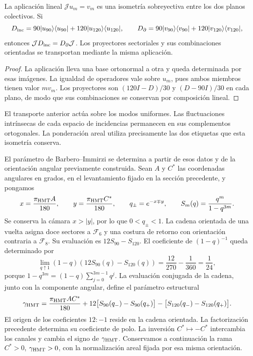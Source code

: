 \begin{proposition}
\label{rev4:ae:colectivo}
La aplicación lineal \(\mathcal J u_m=v_m\) es una isometría
sobreyectiva entre los dos planos colectivos. Si
\[
 D_{\rm inc}=90|u_{90}\rangle\langle u_{90}|
             +120|u_{120}\rangle\langle u_{120}|,
 \qquad
 D_\partial=90|v_{90}\rangle\langle v_{90}|
             +120|v_{120}\rangle\langle v_{120}|,
\]
entonces \(\mathcal J D_{\rm inc}=D_\partial\mathcal J\).
Los proyectores sectoriales y sus combinaciones orientadas se
transportan mediante la misma aplicación.
\end{proposition}
\begin{proof}
La aplicación lleva una base ortonormal a otra y queda determinada
por esas imágenes. La igualdad de operadores vale sobre \(u_m\),
pues ambos miembros tienen valor \(m v_m\). Los proyectores son
\((120I-D)/30\) y \((D-90I)/30\) en cada plano, de modo que
sus combinaciones se conservan por composición lineal.
\end{proof}

El transporte anterior actúa sobre los modos uniformes. Las fluctuaciones
intrínsecas de cada espacio de incidencias permanecen en sus complementos
ortogonales. La ponderación areal utiliza precisamente las dos etiquetas
que esta isometría conserva.

El parámetro de Barbero--Immirzi se determina a partir de esos datos y
de la orientación angular previamente construida. Sean \(A\) y \(C^*\)
las coordenadas angulares en grados, en el levantamiento fijado en la
sección precedente, y pongamos
\[
 x=\frac{\pi_{\rm HMT}A}{180},\qquad
 y=\frac{\pi_{\rm HMT}C^*}{180},\qquad
 q_\pm=e^{-x\mp y},\qquad
 S_m(q)=\frac{q^m}{1-q^{3m}}.
\]
Se conserva la cámara \(x>|y|\), por lo que \(0<q_\pm<1\).
La cadena orientada de una vuelta asigna doce sectores a
\(\mathcal F_6\) y una costura de retorno con orientación contraria
a \(\mathcal F_8\). Su evaluación es \(12S_{90}-S_{120}\).
El coeficiente de \((1-q)^{-1}\) queda determinado por
\[
 \lim_{q\uparrow1}(1-q)(12S_{90}(q)-S_{120}(q))
 =\frac{12}{270}-\frac1{360}=\frac1{24},
\]
porque \(1-q^{3m}=(1-q)\sum_{j=0}^{3m-1}q^j\).
La evaluación conjugada de la cadena, junto con la componente angular,
define el parámetro estructural
\begin{equation}
 \gamma_{\rm HMT}
 =\frac{\pi_{\rm HMT}AC^*}{180}
 +12\bigl[S_{90}(q_-)-S_{90}(q_+)\bigr]
 -\bigl[S_{120}(q_-)-S_{120}(q_+)\bigr].
 \label{rev4:ae:gamma}
\end{equation}
El origen de los coeficientes \(12:-1\) reside en la cadena orientada.
La factorización precedente determina su coeficiente de polo.
La inversión \(C^*\mapsto-C^*\) intercambia los canales y cambia
el signo de \(\gamma_{\rm HMT}\). Conservamos a continuación la
rama \(C^*>0\), \(\gamma_{\rm HMT}>0\), con la normalización
areal fijada por esa misma orientación.

